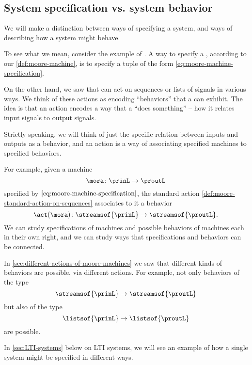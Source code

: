 
\subsection{System specification vs. system behavior}

We will make a distinction between ways of specifying a system, and ways of describing how a system might behave.

To see what we mean, consider the example of . A way to specify a , according to our \cref{def:moore-machine}, is to specify a tuple of the form \cref{eq:moore-machine-specification}.

On the other hand, we saw that  can act on sequences or lists of signals in various ways.
We think of these actions as encoding ``behaviors'' that a  can exhibit.
The idea is that an action encodes a way that a  ``does something'' -- how it relates input signals to output signals.

Strictly speaking, we will think of just the specific relation between inputs and outputs as a behavior, and an action is a way of associating specified machines to specified behaviors.


For example, given a machine
\begin{equation}
    \mora \colon \prinL \to \proutL
\end{equation}
specified by $\cref{eq:moore-machine-specification}$, the standard action \cref{def:moore-standard-action-on-sequences} associates to it a behavior
\begin{equation}
    \act(\mora) \colon \streamsof{\prinL} \to \streamsof{\proutL}.
\end{equation}
We can study specifications of machines and possible behaviors of machines each in their own right, and we can study ways that specifications and behaviors can be connected.

In \cref{sec:different-actions-of-moore-machines} we saw that different kinds of behaviors are possible, via different actions.
For example, not only behaviors of the type
\begin{equation}
    \streamsof{\prinL}  \to \streamsof{\proutL}
\end{equation}
but also of the type
\begin{equation}
    \listsof{\prinL} \to \listsof{\proutL}
\end{equation}
are possible.

In \cref{sec:LTI-systems} below on LTI systems, we will see an example of how a single system might be specified in different ways.

